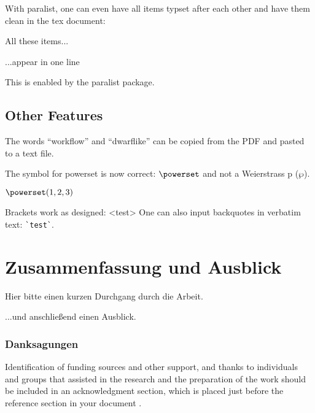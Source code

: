 \documentclass[runningheads,a4paper,ngerman]{llncs}[2022/01/12]
\begin{document}
With paralist, one can even have all items typset after each other and have them clean in the tex document:

\begin{ltgexample}
\begin{inparaenum}
  \item All these items...
  \item ...appear in one line
  \item This is enabled by the paralist package.
\end{inparaenum}
\end{ltgexample}

\subsection{Other Features}

\begin{ltgexample}
The words \enquote{workflow} and \enquote{dwarflike} can be copied from the PDF and pasted to a text file.
\end{ltgexample}

\begin{ltgexample}
The symbol for powerset is now correct: $\powerset$ and not a Weierstrass p ($\wp$).

$\powerset({1,2,3})$
\end{ltgexample}

\begin{ltgexample}
Brackets work as designed:
<test>
One can also input backquotes in verbatim text: \verb|`test`|.
\end{ltgexample}


\section{Zusammenfassung und Ausblick}
\label{sec:outlook}
Hier bitte einen kurzen Durchgang durch die Arbeit.

\lipsum[1-2]

...und anschließend einen Ausblick.

\subsubsection*{Danksagungen}

Identification of funding sources and other support, and thanks to individuals and groups that assisted in the research and the preparation of the work should be included in an acknowledgment section, which is placed just before the reference section in your document \cite{acmart}.
\end{document}
